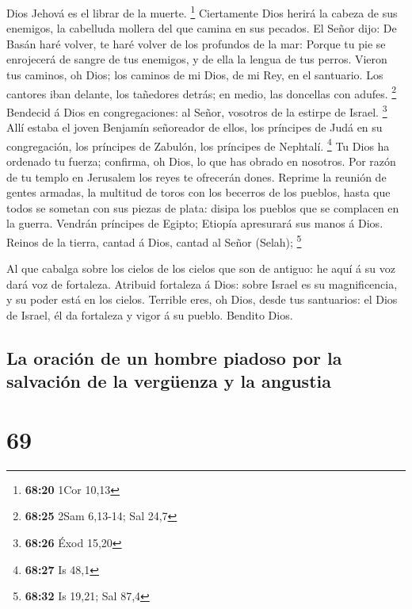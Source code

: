 Dios Jehová es el librar de la muerte. \footnote{\textbf{68:20} 1Cor
  10,13}  Ciertamente Dios herirá la cabeza de sus
enemigos, la cabelluda mollera del que camina en sus pecados.
 El Señor dijo: De Basán haré volver, te haré volver de los
profundos de la mar:  Porque tu pie se enrojecerá de sangre
de tus enemigos, y de ella la lengua de tus perros.  Vieron
tus caminos, oh Dios; los caminos de mi Dios, de mi Rey, en el
santuario.  Los cantores iban delante, los tañedores
detrás; en medio, las doncellas con adufes. \footnote{\textbf{68:25}
  2Sam 6,13-14; Sal 24,7}  Bendecid á Dios en
congregaciones: al Señor, vosotros de la estirpe de Israel. \footnote{\textbf{68:26}
  Éxod 15,20}  Allí estaba el joven Benjamín señoreador de
ellos, los príncipes de Judá en su congregación, los príncipes de
Zabulón, los príncipes de Nephtalí. \footnote{\textbf{68:27} Is 48,1}
 Tu Dios ha ordenado tu fuerza; confirma, oh Dios, lo que
has obrado en nosotros.  Por razón de tu templo en
Jerusalem los reyes te ofrecerán dones.  Reprime la reunión
de gentes armadas, la multitud de toros con los becerros de los pueblos,
hasta que todos se sometan con sus piezas de plata: disipa los pueblos
que se complacen en la guerra.  Vendrán príncipes de
Egipto; Etiopía apresurará sus manos á Dios.  Reinos de la
tierra, cantad á Dios, cantad al Señor (Selah); \footnote{\textbf{68:32}
  Is 19,21; Sal 87,4}

 Al que cabalga sobre los cielos de los cielos que son de
antiguo: he aquí á su voz dará voz de fortaleza.  Atribuid
fortaleza á Dios: sobre Israel es su magnificencia, y su poder está en
los cielos.  Terrible eres, oh Dios, desde tus santuarios:
el Dios de Israel, él da fortaleza y vigor á su pueblo. Bendito Dios.

\hypertarget{la-oraciuxf3n-de-un-hombre-piadoso-por-la-salvaciuxf3n-de-la-verguxfcenza-y-la-angustia}{%
\subsection{La oración de un hombre piadoso por la salvación de la
vergüenza y la
angustia}\label{la-oraciuxf3n-de-un-hombre-piadoso-por-la-salvaciuxf3n-de-la-verguxfcenza-y-la-angustia}}

\hypertarget{section-68}{%
\section{69}\label{section-68}}

